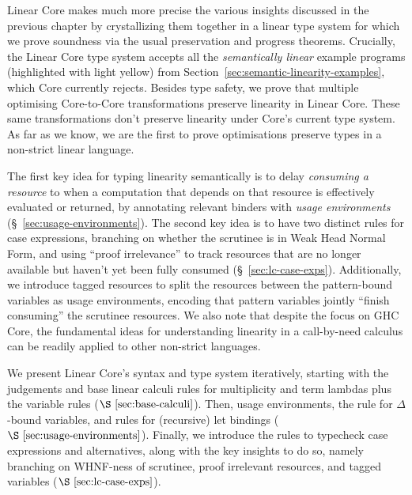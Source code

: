 \documentclass[acmsmall,review]{acmart}
\newcommand{\notyetcolorname}{light yellow}
\begin{document}
Linear Core makes much more precise the various insights discussed in the
previous chapter by crystallizing them together in a linear type system for which we
prove soundness via the usual preservation and progress theorems. Crucially,
the Linear Core type system accepts all the \emph{semantically linear} example
programs (highlighted with \colorbox{notyet}{\notyetcolorname})
from Section~\ref{sec:semantic-linearity-examples}, which Core currently
rejects.
%
Besides type safety, we prove that multiple optimising Core-to-Core
transformations preserve linearity in Linear Core. These same transformations
don't preserve linearity under Core's current type system. As far as we know,
we are the first to prove optimisations preserve types in a non-strict linear
language.

The first key idea for typing linearity semantically is to delay \emph{consuming a
resource} to when a computation that depends on that resource is effectively
evaluated or returned, by annotating relevant binders with \emph{usage
environments} (\S~\ref{sec:usage-environments}).
%
The second key idea is to have two distinct rules for
case expressions, branching on whether the scrutinee is in Weak Head Normal
Form, and using ``proof irrelevance'' to track resources that are no
longer available but haven't yet been fully consumed (\S~\ref{sec:lc-case-exps}). Additionally, we introduce
tagged resources to split the resources between the pattern-bound variables as
usage environments, encoding that pattern variables jointly ``finish
consuming'' the scrutinee resources.
% 
We also note that despite the focus on GHC Core, the fundamental ideas for
understanding linearity in a call-by-need calculus can be readily applied to
other non-strict languages.

We present Linear Core's syntax and type system iteratively, starting with the
judgements and base linear calculi rules for multiplicity and term lambdas plus
the variable rules ($\S~\ref{sec:base-calculi}$).
%
Then, usage environments, the rule for $\Delta$-bound variables, and rules for
(recursive) let bindings ($\S~\ref{sec:usage-environments}$).
%
Finally, we introduce the rules to typecheck case expressions and alternatives,
along with the key insights to do so, namely branching on WHNF-ness of
scrutinee, proof irrelevant resources, and tagged variables
($\S~\ref{sec:lc-case-exps}$).

%
\end{document}
